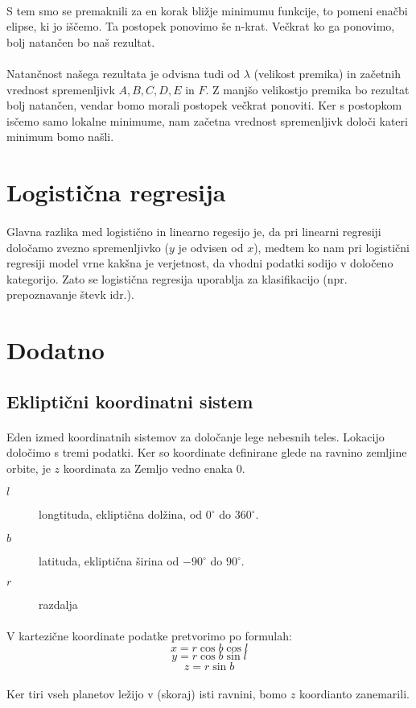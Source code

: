 \documentclass[a4paper, 12pt]{article}
\begin{document}
	\paragraph{}
	S tem smo se premaknili za en korak bližje minimumu funkcije, to pomeni enačbi elipse, ki jo iščemo. Ta postopek ponovimo še n-krat. Večkrat ko ga ponovimo, bolj natančen bo naš rezultat.

	\paragraph{}
	Natančnost našega rezultata je odvisna tudi od $\lambda$ (velikost premika) in začetnih vrednost spremenljivk $A, B, C, D, E$ in $F$. Z manjšo velikostjo premika bo rezultat bolj natančen, vendar bomo morali postopek večkrat ponoviti. Ker s postopkom isčemo samo lokalne minimume, nam začetna vrednost spremenljivk določi kateri minimum bomo našli.

    \section*{Logistična regresija}
    \paragraph{}
    Glavna razlika med logistično in linearno regesijo je, da pri linearni regresiji določamo zvezno spremenljivko ($y$ je odvisen od $x$), medtem ko nam pri logistični regresiji model vrne kakšna je verjetnost, da vhodni podatki sodijo v določeno kategorijo.
    Zato se logistična regresija uporablja za klasifikacijo (npr. prepoznavanje števk idr.).


    \section*{Dodatno}
    \subsection*{Ekliptični koordinatni sistem}
    \paragraph{}
    Eden izmed koordinatnih sistemov za določanje lege nebesnih teles. Lokacijo določimo s tremi podatki. Ker so koordinate definirane glede na ravnino zemljine orbite, je $z$ koordinata za Zemljo vedno enaka 0.
    \begin{description}
        \item[$l$] longtituda, ekliptična dolžina, od $0^\circ$ do $360^\circ$.
        \item[$b$] latituda, ekliptična širina od $-90^\circ$ do $90^\circ$.
        \item[$r$] razdalja
    \end{description}

    \paragraph{}
    V kartezične koordinate podatke pretvorimo po formulah:
    $$x = r \cos b \cos l$$
    $$y = r \cos b \sin l$$
    $$z = r \sin b$$

    \paragraph{}
    Ker tiri vseh planetov ležijo v (skoraj) isti ravnini, bomo $z$ koordianto zanemarili.
\end{document}
